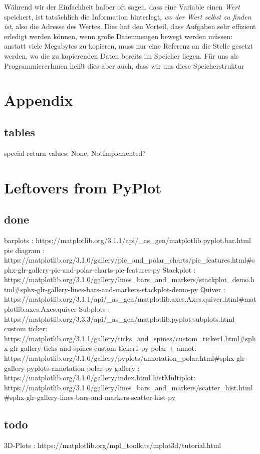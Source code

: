 Während wir der Einfachheit halber oft sagen, dass eine Variable einen \emph{Wert} speichert, ist tatsächlich die Information hinterlegt, \emph{wo der Wert selbst zu finden ist}, also die Adresse des Wertes. Dies hat den Vorteil, dass Aufgaben sehr effizient erledigt werden können, wenn große Datenmengen bewegt werden müssen: anstatt viele Megabytes zu kopieren, muss nur eine Referenz an die Stelle gesetzt werden, wo die zu kopierenden Daten bereits im Speicher liegen. Für uns als ProgrammiererInnen heißt dies aber auch, dass wir uns diese Speicherstruktur

\chapter{Appendix}
\section{tables}
special return values: None, NotImplemented?

\chapter{Leftovers from PyPlot}
\section{done}
barplots     : https://matplotlib.org/3.1.1/api/_as_gen/matplotlib.pyplot.bar.html
pie diagram  : https://matplotlib.org/3.1.0/gallery/pie_and_polar_charts/pie_features.html#sphx-glr-gallery-pie-and-polar-charts-pie-features-py
Stackplot    : https://matplotlib.org/3.1.0/gallery/lines_bars_and_markers/stackplot_demo.html#sphx-glr-gallery-lines-bars-and-markers-stackplot-demo-py
Quiver       : https://matplotlib.org/3.1.1/api/_as_gen/matplotlib.axes.Axes.quiver.html#matplotlib.axes.Axes.quiver
Subplots     : https://matplotlib.org/3.3.3/api/_as_gen/matplotlib.pyplot.subplots.html
custom ticker: https://matplotlib.org/3.1.1/gallery/ticks_and_spines/custom_ticker1.html#sphx-glr-gallery-ticks-and-spines-custom-ticker1-py
polar + annot: https://matplotlib.org/3.1.0/gallery/pyplots/annotation_polar.html#sphx-glr-gallery-pyplots-annotation-polar-py
gallery      : https://matplotlib.org/3.1.0/gallery/index.html
histMultiplot: https://matplotlib.org/3.1.0/gallery/lines_bars_and_markers/scatter_hist.html#sphx-glr-gallery-lines-bars-and-markers-scatter-hist-py

\section{todo}
3D-Plots     : https://matplotlib.org/mpl_toolkits/mplot3d/tutorial.html


